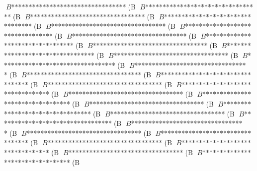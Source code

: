 \documentclass{jbook}
\begin{document}
{{$B$*$*$*$*$*$*$*$*$*$*$*$*$*$*$*$*$*$*$*$*$*$*$*$*$*$*$*$*$*$*$*$*$*(B
$B$*$*$*$*$*$*$*$*$*$*$*$*$*$*$*$*$*$*$*$*$*$*$*$*$*$*$*$*$*$*$*$*$*(B
$B$*$*$*$*$*$*$*$*$*$*$*$*$*$*$*$*$*$*$*$*$*$*$*$*$*$*$*$*$*$*$*$*$*(B
$B$*$*$*$*$*$*$*$*$*$*$*$*$*$*$*$*$*$*$*$*$*$*$*$*$*$*$*$*$*$*$*$*$*(B
$B$*$*$*$*$*$*$*$*$*$*$*$*$*$*$*$*$*$*$*$*$*$*$*$*$*$*$*$*$*$*$*$*$*(B
$B$*$*$*$*$*$*$*$*$*$*$*$*$*$*$*$*$*$*$*$*$*$*$*$*$*$*$*$*$*$*$*$*$*(B
$B$*$*$*$*$*$*$*$*$*$*$*$*$*$*$*$*$*$*$*$*$*$*$*$*$*$*$*$*$*$*$*$*$*(B
$B$*$*$*$*$*$*$*$*$*$*$*$*$*$*$*$*$*$*$*$*$*$*$*$*$*$*$*$*$*$*$*$*$*(B
$B$*$*$*$*$*$*$*$*$*$*$*$*$*$*$*$*$*$*$*$*$*$*$*$*$*$*$*$*$*$*$*$*$*(B
$B$*$*$*$*$*$*$*$*$*$*$*$*$*$*$*$*$*$*$*$*$*$*$*$*$*$*$*$*$*$*$*$*$*(B
$B$*$*$*$*$*$*$*$*$*$*$*$*$*$*$*$*$*$*$*$*$*$*$*$*$*$*$*$*$*$*$*$*$*(B
$B$*$*$*$*$*$*$*$*$*$*$*$*$*$*$*$*$*$*$*$*$*$*$*$*$*$*$*$*$*$*$*$*$*(B
$B$*$*$*$*$*$*$*$*$*$*$*$*$*$*$*$*$*$*$*$*$*$*$*$*$*$*$*$*$*$*$*$*$*(B
$B$*$*$*$*$*$*$*$*$*$*$*$*$*$*$*$*$*$*$*$*$*$*$*$*$*$*$*$*$*$*$*$*$*(B
$B$*$*$*$*$*$*$*$*$*$*$*$*$*$*$*$*$*$*$*$*$*$*$*$*$*$*$*$*$*$*$*$*$*(B
$B$*$*$*$*$*$*$*$*$*$*$*$*$*$*$*$*$*$*$*$*$*$*$*$*$*$*$*$*$*$*$*$*$*(B
$B$*$*$*$*$*$*$*$*$*$*$*$*$*$*$*$*$*$*$*$*$*$*$*$*$*$*$*$*$*$*$*$*$*(B
$B$*$*$*$*$*$*$*$*$*$*$*$*$*$*$*$*$*$*$*$*$*$*$*$*$*$*$*$*$*$*$*$*$*(B
$B$*$*$*$*$*$*$*$*$*$*$*$*$*$*$*$*$*$*$*$*$*$*$*$*$*$*$*$*$*$*$*$*$*(B
$B$*$*$*$*$*$*$*$*$*$*$*$*$*$*$*$*$*$*$*$*$*$*$*$*$*$*$*$*$*$*$*$*$*(B
$B$*$*$*$*$*$*$*$*$*$*$*$*$*$*$*$*$*$*$*$*$*$*$*$*$*$*$*$*$*$*$*$*$*(B
$B$*$*$*$*$*$*$*$*$*$*$*$*$*$*$*$*$*$*$*$*$*$*$*$*$*$*$*$*$*$*$*$*$*(B
$B$*$*$*$*$*$*$*$*$*$*$*$*$*$*$*$*$*$*$*$*$*$*$*$*$*$*$*$*$*$*$*$*$*(B
$B$*$*$*$*$*$*$*$*$*$*$*$*$*$*$*$*$*$*$*$*$*$*$*$*$*$*$*$*$*$*$*$*$*(B
$B$*$*$*$*$*$*$*$*$*$*$*$*$*$*$*$*$*$*$*$*$*$*$*$*$*$*$*$*$*$*$*$*$*(B
$B$*$*$*$*$*$*$*$*$*$*$*$*$*$*$*$*$*$*$*$*$*$*$*$*$*$*$*$*$*$*$*$*$*(B
$B$*$*$*$*$*$*$*$*$*$*$*$*$*$*$*$*$*$*$*$*$*$*$*$*$*$*$*$*$*$*$*$*$*(B
$B$*$*$*$*$*$*$*$*$*$*$*$*$*$*$*$*$*$*$*$*$*$*$*$*$*$*$*$*$*$*$*$*$*(B
$B$*$*$*$*$*$*$*$*$*$*$*$*$*$*$*$*$*$*$*$*$*$*$*$*$*$*$*$*$*$*$*$*$*(B
$B$*$*$*$*$*$*$*$*$*$*$*$*$*$*$*$*$*$*$*$*$*$*$*$*$*$*$*$*$*$*$*$*$*(B
\boutyuu{$B%
$B$*$*$*$*$*$*$*$*$*$*$*$*$*$*$*$*$*$*$*$*$*$*$*$*$*$*$*$*$*$*$*$*$*(B
$B$*$*$*$*$*$*$*$*$*$*$*$*$*$*$*$*$*$*$*$*$*$*$*$*$*$*$*$*$*$*$*$*$*(B
$B$*$*$*$*$*$*$*$*$*$*$*$*$*$*$*$*$*$*$*$*$*$*$*$*$*$*$*$*$*$*$*$*$*(B
$B$*$*$*$*$*$*$*$*$*$*$*$*$*$*$*$*$*$*$*$*$*$*$*$*$*$*$*$*$*$*$*$*$*(B
$B$*$*$*$*$*$*$*$*$*$*$*$*$*$*$*$*$*$*$*$*$*$*$*$*$*$*$*$*$*$*$*$*$*(B
$B$*$*$*$*$*$*$*$*$*$*$*$*$*$*$*$*$*$*$*$*$*$*$*$*$*$*$*$*$*$*$*$*$*(B
}}}
\end{document}
